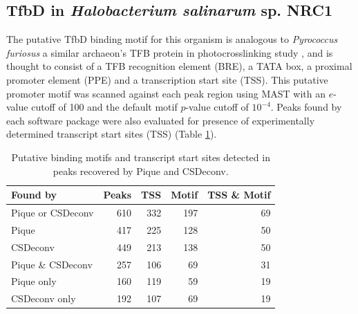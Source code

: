 %

\subsection{TfbD in {\em Halobacterium salinarum} sp. NRC1}

The putative TfbD binding motif for this organism is analogous to {\em
  Pyrococcus furiosus} a similar archaeon's TFB protein in
photocrosslinking study \cite{tfb_promoter}, and is thought to consist
of a TFB recognition element (BRE), a TATA box, a proximal promoter
element (PPE) and a transcription start site (TSS). This putative
promoter motif was scanned against each peak region using MAST
\cite{MAST} with an $e$-value cutoff of 100 and the default motif
$p$-value cutoff of $10^{-4}$. Peaks found by each software package
were also evaluated for presence of experimentally determined
transcript start sites (TSS) \cite{halo_promoters} (Table
\ref{P_table1}).

\begin{table}
  \begin{center}
    \begin{tabular}{l r r r r}
      Found by & Peaks & TSS & Motif & TSS \& Motif \\
      \hline
      Pique or CSDeconv & 610 & 332 & 197 & 69 \\
      Pique             & 417 & 225 & 128 & 50 \\
      CSDeconv          & 449 & 213 & 138 & 50 \\
      Pique \& CSDeconv & 257 & 106 & 69  & 31 \\
      Pique only        & 160 & 119 & 59  & 19 \\
      CSDeconv only     & 192 & 107 & 69  & 19 \\
    \end{tabular}
  \end{center}
  \caption{Putative binding motifs and transcript start sites detected 
    in peaks recovered by Pique and CSDeconv.}\label{P_table1}
\end{table}

